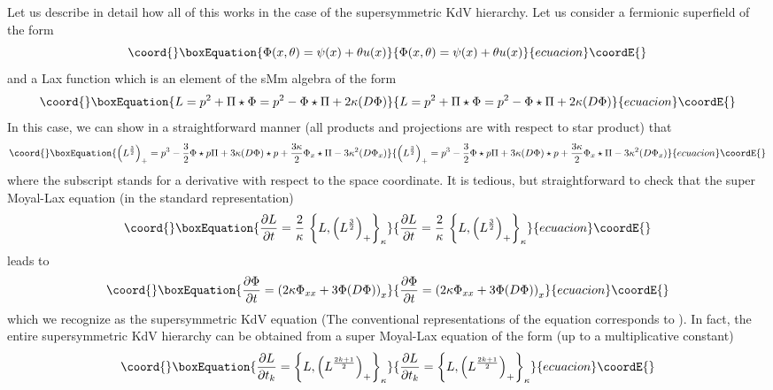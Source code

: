 \documentclass[a4paper,11pt]{article}
\begin{document}
Let us describe in detail how all of this works in the case of the
\coordHE{} supersymmetric KdV hierarchy. Let us consider a fermionic
superfield of the form
\begin{equation}\coord{}\boxEquation{
\Phi(x,\theta) = \psi(x) + \theta u(x)
}{
\Phi(x,\theta) = \psi(x) + \theta u(x)
}{ecuacion}\coordE{}\end{equation}
and a Lax function which is an element of the sMm algebra of the form
\begin{equation}\coord{}\boxEquation{
L = p^{2} + \Pi\star \Phi = p^{2} - \Phi\star \Pi + 2\kappa (D\Phi)
}{
L = p^{2} + \Pi\star \Phi = p^{2} - \Phi\star \Pi + 2\kappa (D\Phi)
}{ecuacion}\coordE{}\end{equation}
In this case, we can show in a straightforward manner (all
products and projections are with respect to star product) that
\begin{equation}\coord{}\boxEquation{
\left(L^{3\over 2}\right)_{+} = p^{3} - {3\over 2}\Phi\star p\Pi +
3\kappa (D\Phi)\star p + {3\kappa\over 2} \Phi_{x}\star \Pi -
3\kappa^{2} (D\Phi_{x})
}{
\left(L^{3\over 2}\right)_{+} = p^{3} - {3\over 2}\Phi\star p\Pi +
3\kappa (D\Phi)\star p + {3\kappa\over 2} \Phi_{x}\star \Pi -
3\kappa^{2} (D\Phi_{x})
}{ecuacion}\coordE{}\end{equation}
where the subscript \coordHE{} stands for a derivative with respect to the
space coordinate. It is tedious, but straightforward to check that the
super Moyal-Lax equation (in the standard representation)
\begin{equation}\coord{}\boxEquation{
{\partial L\over \partial t} = {2\over \kappa}\,\left\{L, \left(L^{3\over
2}\right)_{+}\right\}_{\kappa}\label{12}
}{
{\partial L\over \partial t} = {2\over \kappa}\,\left\{L, \left(L^{3\over
2}\right)_{+}\right\}_{\kappa}}{ecuacion}\coordE{}\end{equation}
leads to
\begin{equation}\coord{}\boxEquation{
{\partial\Phi\over \partial t} = \left(2\kappa \Phi_{xx} + 3 \Phi
(D\Phi)\right)_{x}\label{13}
}{
{\partial\Phi\over \partial t} = \left(2\kappa \Phi_{xx} + 3 \Phi
(D\Phi)\right)_{x}}{ecuacion}\coordE{}\end{equation}
which we recognize as the \coordHE{} supersymmetric KdV equation \cite{2}
(The conventional representations of the equation corresponds to
\coordHE{}).  In fact,
the entire supersymmetric KdV hierarchy can be obtained from a super
Moyal-Lax equation of the form (up to a multiplicative constant)
\begin{equation}\coord{}\boxEquation{
{\partial L\over \partial t_{k}} = \left\{L, \left(L^{2k+1\over
2}\right)_{+}\right\}_{\kappa}\label{14}
}{
{\partial L\over \partial t_{k}} = \left\{L, \left(L^{2k+1\over
2}\right)_{+}\right\}_{\kappa}}{ecuacion}\coordE{}\end{equation}
\end{document}
